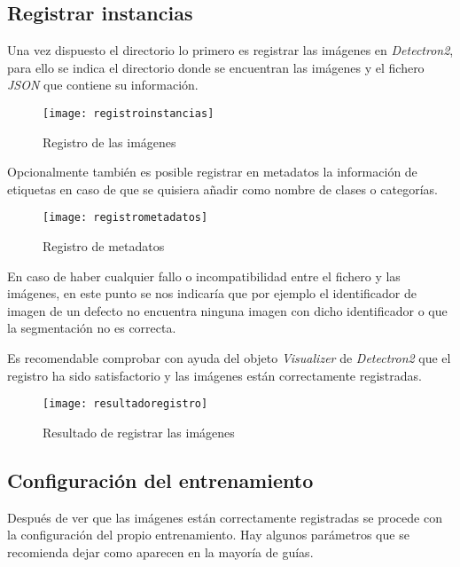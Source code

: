 \subsection{Registrar instancias}
Una vez dispuesto el directorio lo primero es registrar las imágenes en \emph{Detectron2}, para ello se indica el directorio donde se encuentran las imágenes y el fichero \emph{JSON} que contiene su información.

\begin{figure}[htb]
    \centering
    \texttt{[image: registroinstancias]}
    \caption[Registro de las imágenes]{Registro de las imágenes}
\end{figure}

Opcionalmente también es posible registrar en metadatos la información de etiquetas en caso de que se quisiera añadir como nombre de clases o categorías. 

\begin{figure}[htb]
    \centering
    \texttt{[image: registrometadatos]}
    \caption[Registro de metadatos]{Registro de metadatos}
\end{figure}
    
En caso de haber cualquier fallo o incompatibilidad entre el fichero y las imágenes, en este punto se nos indicaría que por ejemplo el identificador de imagen de un defecto no encuentra ninguna imagen con dicho identificador o que la segmentación no es correcta.

\clearpage

Es recomendable comprobar con ayuda del objeto \emph{Visualizer} de \emph{Detectron2} que el registro ha sido satisfactorio y las imágenes están correctamente registradas.

\begin{figure}[htb]
    \centering
    \texttt{[image: resultadoregistro]}
    \caption[Resultado de registrar las imágenes]{Resultado de registrar las imágenes}
\end{figure}
    
\clearpage
    
\subsection{Configuración del entrenamiento}
Después de ver que las imágenes están correctamente registradas se procede con la configuración del propio entrenamiento. Hay algunos parámetros que se recomienda dejar como aparecen en la mayoría de guías.

